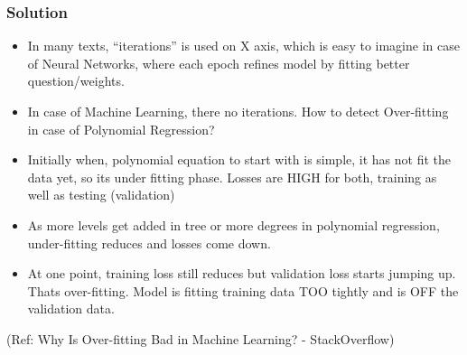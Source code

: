 \begin{frame}[fragile]\frametitle{Solution}

	\begin{itemize}
	\item In many texts, ``iterations'' is used on X axis, which is easy to imagine in case of Neural Networks, where each epoch refines model by fitting better question/weights.
	\item In case of Machine Learning, there no iterations. How to detect Over-fitting in case of Polynomial Regression?
	\item Initially when, polynomial equation to start with is simple, it has not fit the data yet, so its under fitting phase. Losses are HIGH for both, training as well as testing (validation)
	\item As more levels get added in tree or more degrees in polynomial regression, under-fitting reduces and losses come down.
	\item At one point, training loss still reduces but validation loss starts jumping up. Thats over-fitting. Model is fitting training data TOO tightly and is OFF the validation data.
	\end{itemize}

\tiny{(Ref: Why Is Over-fitting Bad in Machine Learning? - StackOverflow)}
\end{frame}



	


